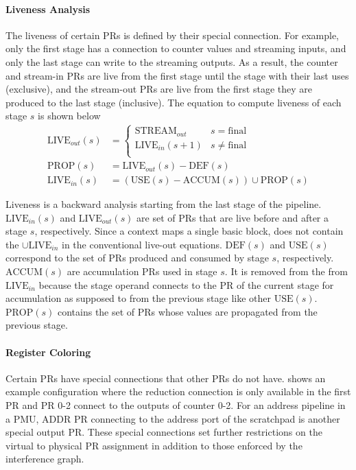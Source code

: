 \paragraph{Liveness Analysis}
The liveness of certain PRs is defined by their special connection. 
For example, only the first stage has a connection to counter values and streaming inputs, and only
the last stage can write to the streaming outputs.
As a result, the counter and stream-in PRs are live from the first stage until the stage with their last uses
(exclusive),
and the stream-out PRs are live from the first stage they are produced to the last stage (inclusive).
The equation to compute liveness of each stage $s$ is shown below
\begin{align}
  \text{LIVE}_{out}(s) &= \begin{cases}
    \text{STREAM}_{out} & s = \text{final} \\
    \text{LIVE}_{in}(s+1) & s \neq \text{final}  \label{eq:liveout}\\
  \end{cases} \\
  \text{PROP}(s) &= \text{LIVE}_{out}(s) - \text{DEF}(s) \\
  \text{LIVE}_{in}(s) &= (\text{USE}(s) - \text{ACCUM}(s))\cup \text{PROP}(s)
\end{align}

Liveness is a backward analysis starting from the last stage of the pipeline. 
$\text{LIVE}_{in}(s)$ and $\text{LIVE}_{out}(s)$ are set of PRs that are live before and after
a stage $s$, respectively.
Since a context
maps a single basic block,  does not contain the $\cup \text{LIVE}_{in}$ in the conventional live-out
equations.
$\text{DEF}(s)$ and $\text{USE}(s)$ correspond to the set of PRs produced and consumed by stage $s$,
respectively.
$\text{ACCUM}(s)$ are accumulation PRs used in stage $s$. It is removed from the from $\text{LIVE}_{in}$
because the stage operand connects to the PR of the current stage for accumulation as supposed to from the
previous stage like other $\text{USE}(s)$.
$\text{PROP}(s)$ contains the set of PRs whose values are propagated from the previous stage.

\paragraph{Register Coloring}
Certain PRs have special connections that other PRs do not have.
 shows an example configuration where the reduction connection is only available in the first PR and PR 0-2 connect to the outputs of counter 0-2.
For an address pipeline in a PMU, ADDR PR connecting to the address port of the scratchpad is
another special output PR.
These special connections set further restrictions on the virtual to physical PR assignment in
addition to those enforced by the interference graph.


